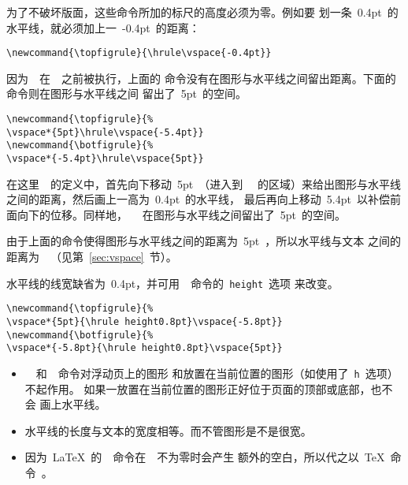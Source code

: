为了不破坏版面，这些命令所加的标尺的高度必须为零。例如要
划一条~0.4pt~的水平线，就必须加上一~-0.4pt~的距离：
\begin{Verbatim}[xleftmargin=1cm]
\newcommand{\topfigrule}{\hrule\vspace{-0.4pt}}
\end{Verbatim}
因为~~在~~之前被执行，上面的
命令没有在图形与水平线之间留出距离。下面的命令则在图形与水平线之间
留出了~5pt~的空间。
\begin{Verbatim}[xleftmargin=1cm]
\newcommand{\topfigrule}{% 
\vspace*{5pt}\hrule\vspace{-5.4pt}} 
\newcommand{\botfigrule}{% 
\vspace*{-5.4pt}\hrule\vspace{5pt}}
\end{Verbatim}
在这里~~的定义中，首先向下移动~5pt~（进入到~
~的区域）来给出图形与水平线之间的距离，然后画上一高为~0.4pt~的水平线，
最后再向上移动~5.4pt~以补偿前面向下的位移。同样地，~~
在图形与水平线之间留出了~5pt~的空间。

由于上面的命令使得图形与水平线之间的距离为~5pt~，所以水平线与文本
之间的距离为~~（见第~\ref{sec:vspace}~节）。

水平线的线宽缺省为~0.4pt，并可用~~命令的~\texttt{height}~选项
来改变。
\begin{Verbatim}[xleftmargin=1cm]
\newcommand{\topfigrule}{% 
\vspace*{5pt}{\hrule height0.8pt}\vspace{-5.8pt}} 
\newcommand{\botfigrule}{% 
\vspace*{-5.8pt}{\hrule height0.8pt}\vspace{5pt}}
\end{Verbatim}

\begin{itemize}
	\item ~~和~~命令对浮动页上的图形
	和放置在当前位置的图形（如使用了~\texttt{h}~选项）不起作用。
	如果一放置在当前位置的图形正好位于页面的顶部或底部，也不会
	画上水平线。
	\item 水平线的长度与文本的宽度相等。而不管图形是不是很宽。
	\item 因为~\LaTeX{}~的~~命令在~~不为零时会产生
	额外的空白，所以代之以~\TeX{}~命令~。
\end{itemize}

